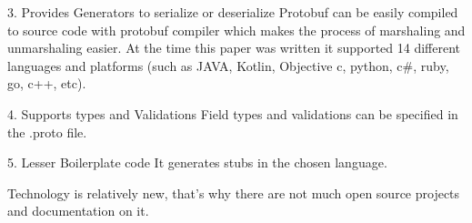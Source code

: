 3. Provides Generators to serialize or deserialize
Protobuf can be easily compiled to source code with protobuf compiler which makes the process of marshaling and unmarshaling easier.
At the time this paper was written it supported 14 different languages and platforms (such as JAVA, Kotlin, Objective c, python, c\#, ruby, go, c++, etc). 

4. Supports types and Validations
Field types and validations can be specified in the .proto file.

5. Lesser Boilerplate code
It generates stubs in the chosen language.

Technology is relatively new, that's why there are not much open source projects and documentation on it.

